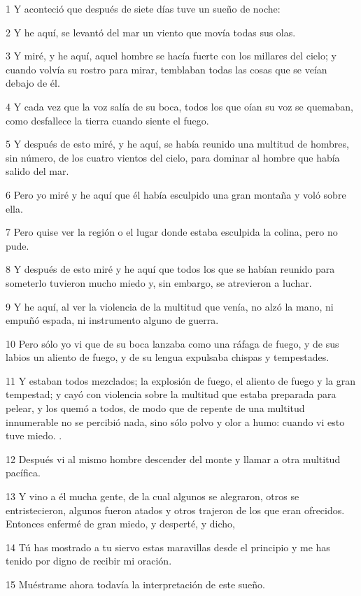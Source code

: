 \par 1 Y aconteció que después de siete días tuve un sueño de noche:
\par 2 Y he aquí, se levantó del mar un viento que movía todas sus olas.
\par 3 Y miré, y he aquí, aquel hombre se hacía fuerte con los millares del cielo; y cuando volvía su rostro para mirar, temblaban todas las cosas que se veían debajo de él.
\par 4 Y cada vez que la voz salía de su boca, todos los que oían su voz se quemaban, como desfallece la tierra cuando siente el fuego.
\par 5 Y después de esto miré, y he aquí, se había reunido una multitud de hombres, sin número, de los cuatro vientos del cielo, para dominar al hombre que había salido del mar.
\par 6 Pero yo miré y he aquí que él había esculpido una gran montaña y voló sobre ella.
\par 7 Pero quise ver la región o el lugar donde estaba esculpida la colina, pero no pude.
\par 8 Y después de esto miré y he aquí que todos los que se habían reunido para someterlo tuvieron mucho miedo y, sin embargo, se atrevieron a luchar.
\par 9 Y he aquí, al ver la violencia de la multitud que venía, no alzó la mano, ni empuñó espada, ni instrumento alguno de guerra.
\par 10 Pero sólo yo vi que de su boca lanzaba como una ráfaga de fuego, y de sus labios un aliento de fuego, y de su lengua expulsaba chispas y tempestades.
\par 11 Y estaban todos mezclados; la explosión de fuego, el aliento de fuego y la gran tempestad; y cayó con violencia sobre la multitud que estaba preparada para pelear, y los quemó a todos, de modo que de repente de una multitud innumerable no se percibió nada, sino sólo polvo y olor a humo: cuando vi esto tuve miedo. .
\par 12 Después vi al mismo hombre descender del monte y llamar a otra multitud pacífica.
\par 13 Y vino a él mucha gente, de la cual algunos se alegraron, otros se entristecieron, algunos fueron atados y otros trajeron de los que eran ofrecidos. Entonces enfermé de gran miedo, y desperté, y dicho,
\par 14 Tú has mostrado a tu siervo estas maravillas desde el principio y me has tenido por digno de recibir mi oración.
\par 15 Muéstrame ahora todavía la interpretación de este sueño.
